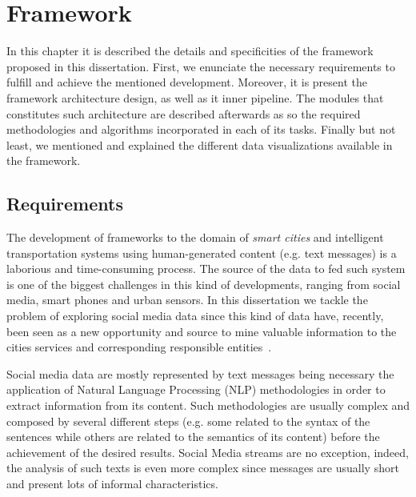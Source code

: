 \chapter{Framework}
\label{chap:framework}

\minitoc \mtcskip \noindent

In this chapter it is described the details and specificities of the framework proposed in this dissertation. First, we enunciate the necessary requirements to fulfill and achieve the mentioned development. Moreover, it is present the framework architecture design, as well as it inner pipeline. The modules that constitutes such architecture are described afterwards as so the required methodologies and algorithms incorporated in each of its tasks. Finally but not least, we mentioned and explained the different data visualizations available in the framework.

\section{Requirements}\label{sec:requirements}

The development of frameworks to the domain of \textit{smart cities} and intelligent transportation systems using human-generated content (e.g. text messages) is a laborious and time-consuming process. The source of the data to fed such system is one of the biggest challenges in this kind of developments, ranging from social media, smart phones and urban sensors. In this dissertation we tackle the problem of exploring social media data since this kind of data have, recently, been seen as a new opportunity and source to mine valuable information to the cities services and corresponding responsible entities~\cite{kn:Musto2015}.

Social media data are mostly represented by text messages being necessary the application of Natural Language Processing (NLP) methodologies in order to extract information from its content. Such methodologies are usually complex and composed by several different steps (e.g. some related to the syntax of the sentences while others are related to the semantics of its content) before the achievement of the desired results. Social Media streams are no exception, indeed, the analysis of such texts is even more complex since messages are usually short and present lots of informal characteristics.

